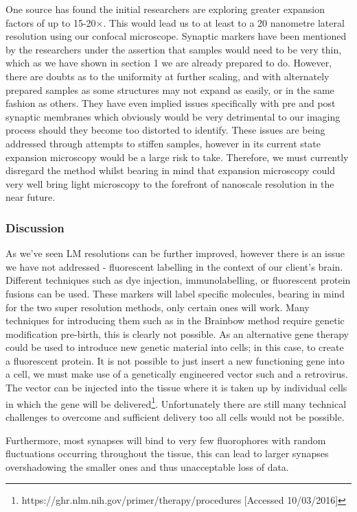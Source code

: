 \documentclass[a4paper, 11pt]{article}
\numberwithin{equation}{section}
\begin{document}
One source has found the initial researchers are exploring greater expansion factors of up to 15-20$\times$. This would lead us to at least to a 20 nanometre lateral resolution using our confocal microscope.  Synaptic markers have been mentioned by the researchers under the assertion that samples would need to be very thin, which as we have shown in section 1 we are already prepared to do. However, there are doubts as to the uniformity at further scaling, and with alternately prepared samples as some structures may not expand as easily, or in the same fashion as others. They have even implied issues specifically with pre and post synaptic membranes which obviously would be very detrimental to our imaging process should they become too distorted to identify. These issues are being addressed through attempts to stiffen samples, however in its current state expansion microscopy would be a large risk to take. Therefore, we must currently disregard the method whilst bearing in mind that expansion microscopy could very well bring light microscopy to the forefront of nanoscale resolution in the near future. \cite{marx2016optimizing}

\subsubsection{Discussion}
As we've seen LM resolutions can be further improved, however there is an issue we have not addressed - fluorescent labelling in the context of our client's brain. Different techniques such as dye injection, immunolabelling, or fluorescent protein fusions can be used. These markers will label specific molecules, bearing in mind for the two super resolution methods, only certain ones will work. Many techniques for introducing them such as in the Brainbow method require genetic modification pre-birth, this is clearly not possible. As an alternative gene therapy could be used to introduce new genetic material into cells; in this case, to create a fluorescent protein. It is not possible to just insert a new functioning gene into a cell, we must make use of a genetically engineered vector such and a retrovirus. The vector can be injected into the tissue where it is taken up by individual cells in which the gene will be delivered\footnote{https://ghr.nlm.nih.gov/primer/therapy/procedures [Accessed 10/03/2016]}. Unfortunately there are still many technical challenges to overcome and sufficient delivery too all cells would not be possible. 

Furthermore, most synapses will bind to very few fluorophores with random fluctuations occurring throughout the tissue, this can lead to larger synapses overshadowing the smaller ones \cite{mishchenko2010optical}and thus unacceptable loss of data.
\end{document}
